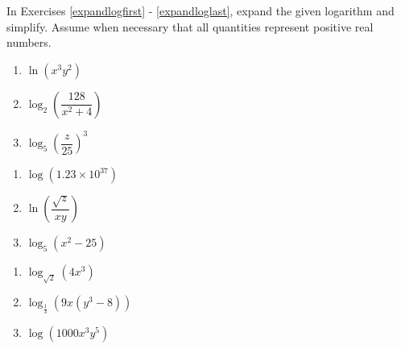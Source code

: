 \documentclass{ximera}
\begin{document}
	\author{Stitz-Zeager}


\label{ExercisesforPropertiesofLogarithms}

In Exercises \ref{expandlogfirst} - \ref{expandloglast}, expand the given logarithm and simplify.  Assume when necessary that all quantities represent positive real numbers.

\begin{multicols}{3}
\begin{enumerate}

\item $\ln(x^{3}y^{2})$  \label{expandlogfirst}
\item $\log_{2}\left(\dfrac{128}{x^{2} + 4}\right)$
\item $\log_{5}\left(\dfrac{z}{25}\right)^{3}$ 

\setcounter{HW}{\value{enumi}}
\end{enumerate}
\end{multicols}

\begin{multicols}{3}
\begin{enumerate}
\setcounter{enumi}{\value{HW}}

\item $\log(1.23 \times 10^{37})$ 
\item $\ln\left(\dfrac{\sqrt{z}}{xy}\right)$
\item $\log_{5} \left(x^2 - 25 \right)$ 

\setcounter{HW}{\value{enumi}}
\end{enumerate}
\end{multicols}

\begin{multicols}{3}
\begin{enumerate}
\setcounter{enumi}{\value{HW}}

\item $\log_{\sqrt{2}} \left(4x^3\right)$
\item $\log_{\frac{1}{3}}(9x(y^{3} - 8))$
\item $\log\left(1000x^3y^5\right)$

\setcounter{HW}{\value{enumi}}
\end{enumerate}
\end{multicols}
\end{document}

